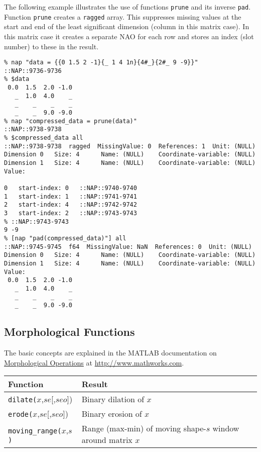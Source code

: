 The following example illustrates the use of functions 
  \texttt{prune} and its inverse 
  \texttt{pad}. Function 
  \texttt{prune} creates a 
  \texttt{ragged} array. This suppresses missing values at the
  start and end of the least significant dimension (column in this
  matrix case). In this matrix case it creates a separate NAO for each
  row and stores an index (slot number) to these in the result.
  \begin{verbatim}
% nap "data = {{0 1.5 2 -1}{_ 1 4 1n}{4#_}{2#_ 9 -9}}"
::NAP::9736-9736
% $data
 0.0  1.5  2.0 -1.0
   _  1.0  4.0    _
   _    _    _    _
   _    _  9.0 -9.0
% nap "compressed_data = prune(data)"
::NAP::9738-9738
% $compressed_data all
::NAP::9738-9738  ragged  MissingValue: 0  References: 1  Unit: (NULL)
Dimension 0   Size: 4      Name: (NULL)    Coordinate-variable: (NULL)
Dimension 1   Size: 4      Name: (NULL)    Coordinate-variable: (NULL)
Value:

0   start-index: 0   ::NAP::9740-9740
1   start-index: 1   ::NAP::9741-9741
2   start-index: 4   ::NAP::9742-9742
3   start-index: 2   ::NAP::9743-9743
% ::NAP::9743-9743
9 -9
% [nap "pad(compressed_data)"] all
::NAP::9745-9745  f64  MissingValue: NaN  References: 0  Unit: (NULL)
Dimension 0   Size: 4      Name: (NULL)    Coordinate-variable: (NULL)
Dimension 1   Size: 4      Name: (NULL)    Coordinate-variable: (NULL)
Value:
 0.0  1.5  2.0 -1.0
   _  1.0  4.0    _
   _    _    _    _
   _    _  9.0 -9.0
\end{verbatim}

\subsection{Morphological Functions}
    \label{function-Morphological}

  \par The basic concepts are explained in the MATLAB documentation on 
  \href{http://www.mathworks.com/access/helpdesk/help/toolbox/images/morph.html}
  {Morphological Operations}
  at
  \href{http://www.mathworks.com} {http://www.mathworks.com}.

  \begin{tabular}{|l|l|}
    \hline 
      \textbf{Function} & \textbf{Result}
    \\
      \hline 
      \hline 
        \texttt{dilate(}$x$,$se$[,$seo$]) & Binary dilation of $x$
      \\
      \hline 
        \texttt{erode(}$x$,$se$[,$seo$]) & Binary erosion of $x$
      \\
      \hline 
        \texttt{moving\_range(}$x$,$s$\texttt{)} & Range (max-min) of moving shape-$s$ window around matrix $x$
      \\
  \hline
\end{tabular}

